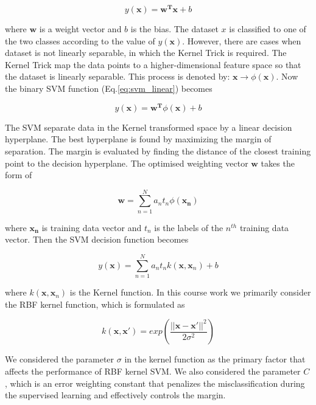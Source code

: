 \documentclass[10pt,twocolumn,letterpaper]{article}
\begin{document}
\begin{equation}
y(\boldsymbol{x}) = \boldsymbol{w^T x} + b
\label{eq:svm_linear}
\end{equation}

where $\boldsymbol{w}$ is a weight vector and $b$ is the bias. The dataset $x$ is classified to one of the two classes according to the value of $y(\boldsymbol{x})$. However, there are cases when dataset is not linearly separable, in which the Kernel Trick is required. The Kernel Trick map the data points to a higher-dimensional feature space so that the dataset is linearly separable. This process is denoted by: $\boldsymbol{x} \rightarrow \phi (\boldsymbol{x})$. Now the binary SVM function (Eq.\ref{eq:svm_linear}) becomes

\begin{equation}
y(\boldsymbol{x}) = \boldsymbol{w^T} \phi (\boldsymbol{x}) + b
\end{equation}

The SVM separate data in the Kernel transformed space by a linear decision hyperplane. The best hyperplane is found by maximizing the margin of separation. The margin is evaluated by finding the distance of the closest training point to the decision hyperplane. The optimised weighting vector $\boldsymbol{w}$ takes the form of

\begin{equation}
\boldsymbol{w} = \sum_{n=1}^{N} a_n t_n \phi(\boldsymbol{x_n})
\end{equation}

where $\boldsymbol{x_n}$ is training data vector and $t_n$ is the labels of the $n^{th}$ training data vector. Then the SVM decision function becomes

\begin{equation}
	y(\boldsymbol{x}) = \sum_{n=1}^{N} a_n t_n k(\boldsymbol{x}, \boldsymbol{x}_n)  + b
\end{equation}

where $k(\boldsymbol{x}, \boldsymbol{x}_n) $ is the Kernel function. In this course work we primarily consider the RBF kernel function, which is formulated as

\begin{equation}
 k(\boldsymbol{x}, \boldsymbol{x'}) = exp(\frac{||\boldsymbol{x} - \boldsymbol{x'}||^2}{2 \sigma^2})
 \label{eq:RBF}
\end{equation}

We considered the parameter $\sigma$ in the kernel function as the primary factor that affects the performance of RBF kernel SVM. We also considered the parameter $C$, which is an error weighting constant that penalizes the misclassification during the supervised learning and effectively controls the margin.
\end{document}
